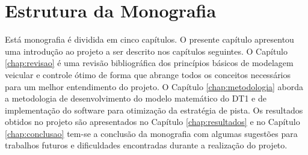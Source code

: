 \section{Estrutura da Monografia}
\label{sec:organizacao}

Está monografia é dividida em cinco capítulos. O presente capítulo apresentou uma introdução ao projeto a ser descrito nos capítulos seguintes. 
O Capítulo \ref{chap:revisao} é uma revisão bibliográfica dos princípios básicos de modelagem veicular e controle ótimo de forma que abrange todos os
conceitos necessários para um melhor entendimento do projeto. O Capítulo \ref{chap:metodologia} aborda a metodologia de desenvolvimento do modelo matemático do DT1 e de implementação do software
para otimização da estratégia de pista. Os resultados obtidos no projeto são apresentados no Capítulo \ref{chap:resultados} e no 
Capítulo \ref{chap:conclusao} tem-se a conclusão da monografia com algumas sugestões para trabalhos futuros e dificuldades encontradas durante a realização do projeto.

\clearpage
